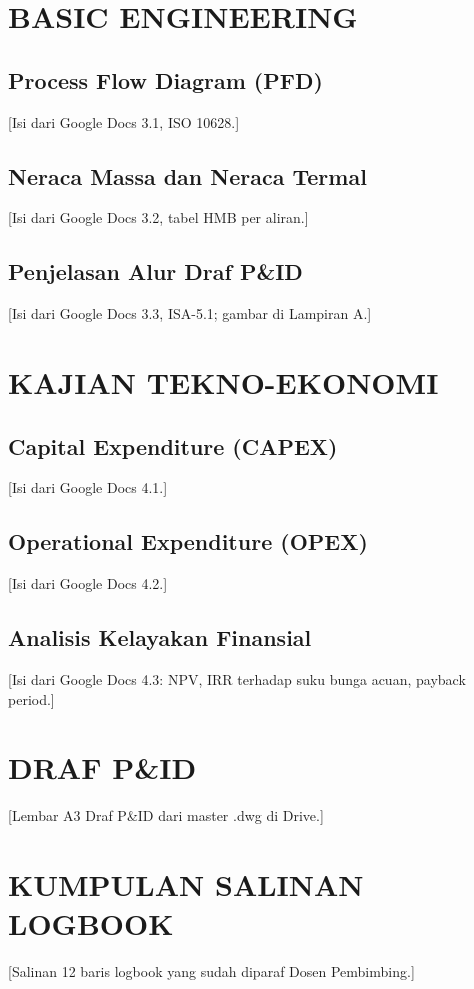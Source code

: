 \documentclass[12pt, a4paper]{report}
\begin{document}
\chapter{BASIC ENGINEERING}
\section{Process Flow Diagram (PFD)}
[Isi dari Google Docs 3.1, ISO 10628.]

\section{Neraca Massa dan Neraca Termal}
[Isi dari Google Docs 3.2, tabel HMB per aliran.]

\section{Penjelasan Alur Draf P\&ID}
[Isi dari Google Docs 3.3, ISA-5.1; gambar di Lampiran A.]

\chapter{KAJIAN TEKNO-EKONOMI}
\section{Capital Expenditure (CAPEX)}
[Isi dari Google Docs 4.1.]

\section{Operational Expenditure (OPEX)}
[Isi dari Google Docs 4.2.]

\section{Analisis Kelayakan Finansial}
[Isi dari Google Docs 4.3: NPV, IRR terhadap suku bunga acuan, payback period.]

\appendix
\chapter{DRAF P\&ID}
[Lembar A3 Draf P\&ID dari master .dwg di Drive.]

\chapter{KUMPULAN SALINAN LOGBOOK}
[Salinan 12 baris logbook yang sudah diparaf Dosen Pembimbing.]
\end{document}
